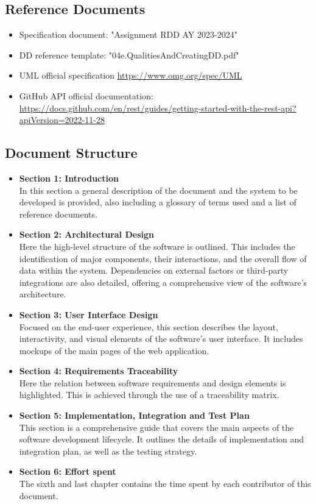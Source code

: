 \subsection{Reference Documents}
\begin{itemize}
    \item Specification document: "Assignment RDD AY 2023-2024"
    \item DD reference template: "04e.QualitiesAndCreatingDD.pdf"
    \item UML official specification \href{https://www.omg.org/spec/UML}{https://www.omg.org/spec/UML}
    \item GitHub API official documentation: \href{https://docs.github.com/en/rest/guides/getting-started-with-the-rest-api?apiVersion=2022-11-28}{https://docs.github.com/en/rest/guides/getting-started-with-the-rest-api?apiVersion=2022-11-28}
\end{itemize}

\subsection{Document Structure}
\begin{itemize}
    \item \textbf{Section 1: Introduction}\\ In this section a general description of the document and the system to be developed is provided, also including a glossary of terms used and a list of reference documents.
    \item \textbf{Section 2: Architectural Design}\\ Here the high-level structure of the software is outlined. This includes the identification of major components, their interactions, and the overall flow of data within the system. Dependencies on external factors or third-party integrations are also detailed, offering a comprehensive view of the software's architecture.
    \item \textbf{Section 3: User Interface Design}\\ Focused on the end-user experience, this section describes the layout, interactivity, and visual elements of the software's user interface. It includes mockups of the main pages of the web application.
    \item \textbf{Section 4: Requirements Traceability}\\ Here the relation between software requirements and design elements is highlighted. This is achieved through the use of a traceability matrix.
    \item \textbf{Section 5: Implementation, Integration and Test Plan}\\ This section is a comprehensive guide that covers the main aspects of the software development lifecycle. It outlines the details of implementation and integration plan, as well as the testing strategy.
    \item \textbf{Section 6: Effort spent}\\The sixth and last chapter contains the time spent by each contributor of this document.
\end{itemize}